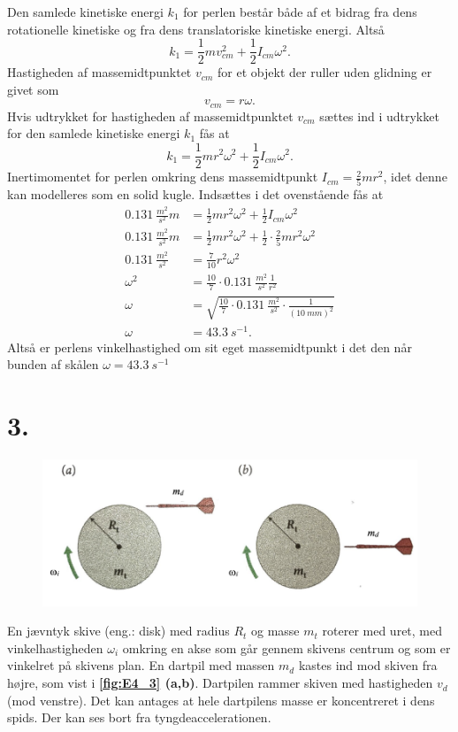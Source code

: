 \documentclass[12pt]{article}
\theoremstyle{definition}
\begin{document}
Den samlede kinetiske energi $k_1$ for perlen består både af et bidrag fra dens rotationelle kinetiske og fra dens translatoriske kinetiske energi. Altså
\[ 
k_1 = \frac{1}{2}mv_{cm}^2 + \frac{1}{2}I_{cm}\omega^2
.\]
Hastigheden af massemidtpunktet $v_{cm}$ for et objekt der ruller uden glidning er givet som
\[ 
v_{cm} = r\omega
.\]
Hvis udtrykket for hastigheden af massemidtpunktet $v_{cm}$ sættes ind i udtrykket for den samlede kinetiske energi $k_1$ fås at
\[ 
k_1 = \frac{1}{2}m r^2\omega^2 + \frac{1}{2}I_{cm}\omega^2
.\]
Inertimomentet for perlen omkring dens massemidtpunkt $I_{cm} = \frac{2}{5}mr^2$, idet denne kan modelleres som en solid kugle. Indsættes \label{eq:kinp} i det ovenstående fås at
\begin{align*}
  \qty{0,131}{\frac{m^2}{s^2}} m &= \frac{1}{2}m r^2 \omega^2 + \frac{1}{2}I_{cm}\omega^2 \\
  \qty{0,131}{\frac{m^2}{s^2}} m &= \frac{1}{2}m r^2 \omega^2 + \frac{1}{2} \cdot \frac{2}{5}mr^2 \omega^2 \\
  \qty{0,131}{\frac{m^2}{s^2}} &= \frac{7}{10} r^2 \omega^2 \\
  \omega^2 &= \frac{10}{7} \cdot \qty{0,131}{\frac{m^2}{s^2}} \frac{1}{r^2} \\
  \omega &= \sqrt{\frac{10}{7} \cdot \qty{0,131}{\frac{m^2}{s^2}} \cdot \frac{1}{(\qty{10}{mm})^2}} \\
  \omega &= \qty{43,3}{s^{-1}} 
.\end{align*}
Altså er perlens vinkelhastighed om sit eget massemidtpunkt i det den når bunden af skålen \underline{\underline{$\omega = \qty{43,3}{s^{-1}}$}}

\section*{3.}
\begin{figure} [ht]
  \centering
  \caption{}
  \includegraphics[width=0.5\linewidth]{../figures/E4_3.png}
  \label{fig:E4_3}
\end{figure}

En jævntyk skive (eng.: disk) med radius $R_t$ og masse $m_t$ roterer med uret, med vinkelhastigheden $\omega_i$ omkring en akse som går gennem skivens centrum og som er vinkelret på skivens plan. En dartpil med massen $m_d$ kastes ind mod skiven fra højre, som vist i \textbf{\autoref{fig:E4_3} (a,b)}. Dartpilen rammer skiven med hastigheden $v_d$ (mod venstre). Det kan antages at hele dartpilens masse er koncentreret i dens spids. Der kan ses bort fra tyngdeaccelerationen.
\end{document}
